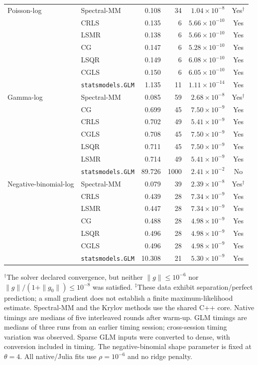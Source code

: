 \begin{table}[htbp]
\begin{tabular}{llrrrc}
Poisson-log
& Spectral-MM & 0.108 & 34 & $1.04\times10^{-8}$ & Yes$^{\dagger}$ \\
& CRLS & 0.135 & 6 & $5.66\times10^{-10}$ & Yes \\
& LSMR & 0.138 & 6 & $5.66\times10^{-10}$ & Yes \\
& CG & 0.147 & 6 & $5.28\times10^{-10}$ & Yes \\
& LSQR & 0.149 & 6 & $6.08\times10^{-10}$ & Yes \\
& CGLS & 0.150 & 6 & $6.05\times10^{-10}$ & Yes \\
& \texttt{statsmodels.GLM} & 1.135 & 11 & $1.11\times10^{-14}$ & Yes \\
\midrule

Gamma-log
& Spectral-MM & 0.085 & 59 & $2.68\times10^{-8}$ & Yes$^{\dagger}$ \\
& CG & 0.699 & 45 & $7.50\times10^{-9}$ & Yes \\
& CRLS & 0.702 & 49 & $5.41\times10^{-9}$ & Yes \\
& CGLS & 0.708 & 45 & $7.50\times10^{-9}$ & Yes \\
& LSQR & 0.711 & 45 & $7.50\times10^{-9}$ & Yes \\
& LSMR & 0.714 & 49 & $5.41\times10^{-9}$ & Yes \\
& \texttt{statsmodels.GLM} & 89.726 & 1000 & $2.41\times10^{-2}$ & No \\
\midrule

Negative-binomial-log
& Spectral-MM & 0.079 & 39 & $2.39\times10^{-8}$ & Yes$^{\dagger}$ \\
& CRLS & 0.439 & 28 & $7.34\times10^{-9}$ & Yes \\
& LSMR & 0.447 & 28 & $7.34\times10^{-9}$ & Yes \\
& CG & 0.488 & 28 & $4.98\times10^{-9}$ & Yes \\
& LSQR & 0.496 & 28 & $4.98\times10^{-9}$ & Yes \\
& CGLS & 0.496 & 28 & $4.98\times10^{-9}$ & Yes \\
& \texttt{statsmodels.GLM} & 10.308 & 21 & $5.30\times10^{-9}$ & Yes \\

\bottomrule
\end{tabular}
\par\smallskip
\begin{minipage}{\linewidth}
\footnotesize
$^{\dagger}$The solver declared convergence, but neither $\|g\|\leq 10^{-6}$ nor
$\|g\|/(1+\|g_0\|)\leq 10^{-8}$ was satisfied.
$^{\ddagger}$These data exhibit separation/perfect prediction; a small gradient does not establish a finite maximum-likelihood estimate.
Spectral-MM and the Krylov methods use the shared C++ core.
Native timings are medians of five interleaved rounds after warm-up.
GLM timings are medians of three runs from an earlier timing session;
cross-session timing variation was observed. Sparse GLM inputs were converted to dense, with conversion included in timing.
The negative-binomial shape parameter is fixed at $\theta=4$.
All native/Julia fits use $\rho=10^{-6}$ and no ridge penalty.
\end{minipage}
\end{table}


